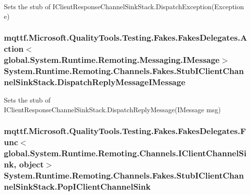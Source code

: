 Sets the stub of I\-Client\-Response\-Channel\-Sink\-Stack.\-Dispatch\-Exception(\-Exception e)

\hypertarget{class_system_1_1_runtime_1_1_remoting_1_1_channels_1_1_fakes_1_1_stub_i_client_channel_sink_stack_af1cf8881a2384ff66b2e63b79a31bfed}{
\subsubsection[{Dispatch\-Reply\-Message\-I\-Message}]{\setlength{\rightskip}{0pt plus 5cm}mqttf.\-Microsoft.\-Quality\-Tools.\-Testing.\-Fakes.\-Fakes\-Delegates.\-Action$<$global.\-System.\-Runtime.\-Remoting.\-Messaging.\-I\-Message$>$ System.\-Runtime.\-Remoting.\-Channels.\-Fakes.\-Stub\-I\-Client\-Channel\-Sink\-Stack.\-Dispatch\-Reply\-Message\-I\-Message}}\label{class_system_1_1_runtime_1_1_remoting_1_1_channels_1_1_fakes_1_1_stub_i_client_channel_sink_stack_af1cf8881a2384ff66b2e63b79a31bfed}


Sets the stub of I\-Client\-Response\-Channel\-Sink\-Stack.\-Dispatch\-Reply\-Message(\-I\-Message msg)

\hypertarget{class_system_1_1_runtime_1_1_remoting_1_1_channels_1_1_fakes_1_1_stub_i_client_channel_sink_stack_a001c1bc3364f777ebcfb68646521a008}{
\subsubsection[{Pop\-I\-Client\-Channel\-Sink}]{\setlength{\rightskip}{0pt plus 5cm}mqttf.\-Microsoft.\-Quality\-Tools.\-Testing.\-Fakes.\-Fakes\-Delegates.\-Func$<$global.\-System.\-Runtime.\-Remoting.\-Channels.\-I\-Client\-Channel\-Sink, object$>$ System.\-Runtime.\-Remoting.\-Channels.\-Fakes.\-Stub\-I\-Client\-Channel\-Sink\-Stack.\-Pop\-I\-Client\-Channel\-Sink}}\label{class_system_1_1_runtime_1_1_remoting_1_1_channels_1_1_fakes_1_1_stub_i_client_channel_sink_stack_a001c1bc3364f777ebcfb68646521a008}


